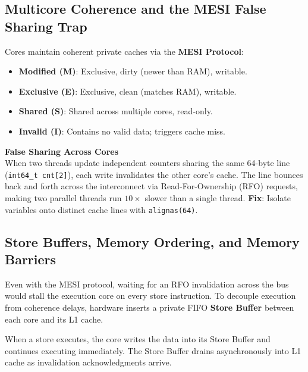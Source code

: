 \subsection{Multicore Coherence and the MESI False Sharing Trap}

Cores maintain coherent private caches via the \textbf{MESI Protocol}:
\begin{itemize}[itemsep=0pt]
    \item \textbf{Modified (M)}: Exclusive, dirty (newer than RAM), writable.
    \item \textbf{Exclusive (E)}: Exclusive, clean (matches RAM), writable.
    \item \textbf{Shared (S)}: Shared across multiple cores, read-only.
    \item \textbf{Invalid (I)}: Contains no valid data; triggers cache miss.
\end{itemize}

\begin{trapbox}
\textbf{False Sharing Across Cores}\\
When two threads update independent counters sharing the same 64-byte line
(\texttt{int64\_t cnt[2]}), each write invalidates the other core's cache.
The line bounces back and forth across the interconnect via Read-For-Ownership (RFO) requests,
making two parallel threads run $10\times$ slower than a single thread.
\textbf{Fix}: Isolate variables onto distinct cache lines with \texttt{alignas(64)}.
\end{trapbox}

\subsection{Store Buffers, Memory Ordering, and Memory Barriers}

Even with the MESI protocol, waiting for an RFO invalidation across the bus would
stall the execution core on every store instruction. To decouple execution from coherence
delays, hardware inserts a private FIFO \textbf{Store Buffer} between each core and its L1 cache.

When a store executes, the core writes the data into its Store Buffer and continues
executing immediately. The Store Buffer drains asynchronously into L1 cache as invalidation
acknowledgments arrive.

